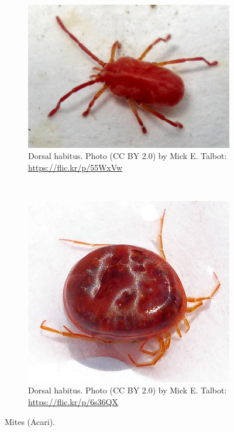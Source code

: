 \documentclass[letterpaper, 11pt]{article}
\begin{document}
\begin{figure}[ht!]
    \centering
    \begin{subfigure}[ht!]{0.5\textwidth}
        \includegraphics[width=\textwidth]{mite1}
        \caption{Dorsal habitus. Photo (CC BY 2.0) by Mick E. Talbot: \url{https://flic.kr/p/55WxVw}}
        \label{fig:mite1}
    \end{subfigure}
    ~ %
    \begin{subfigure}[ht!]{0.4\textwidth}
        \includegraphics[width=\textwidth]{mite2}
        \caption{Dorsal habitus. Photo (CC BY 2.0) by Mick E. Talbot: \url{https://flic.kr/p/6s36QX}}
        \label{fig:mite2}
    \end{subfigure}
    \caption{Mites (Acari).} \label{fig:mites}
\end{figure}
\end{document}
